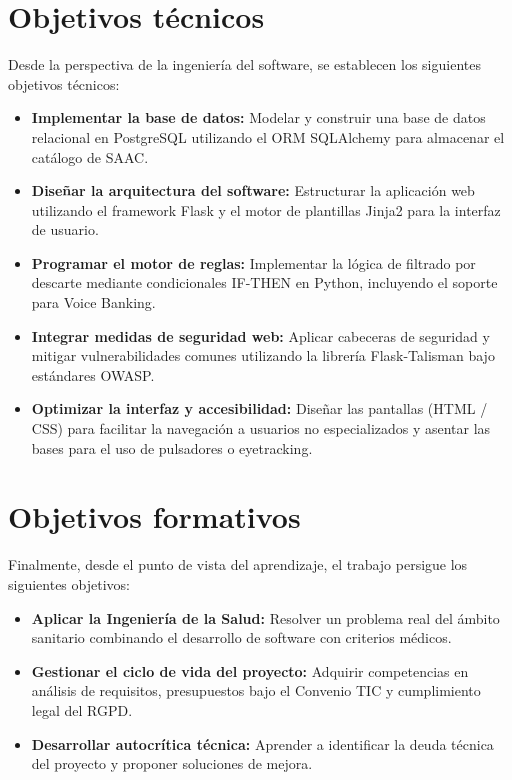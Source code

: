 \section{Objetivos técnicos}
Desde la perspectiva de la ingeniería del software, se establecen los siguientes objetivos técnicos:
\begin{itemize}
    	\item \textbf{Implementar la base de datos:} Modelar y construir una base de datos relacional en PostgreSQL utilizando el ORM SQLAlchemy para almacenar el catálogo de SAAC.
    	\item \textbf{Diseñar la arquitectura del software:} Estructurar la aplicación web utilizando el framework Flask y el motor de plantillas Jinja2 para la interfaz de usuario.
    	\item \textbf{Programar el motor de reglas:} Implementar la lógica de filtrado por descarte mediante condicionales IF-THEN en Python, incluyendo el soporte para Voice Banking.
    	\item \textbf{Integrar medidas de seguridad web:} Aplicar cabeceras de seguridad y mitigar vulnerabilidades comunes utilizando la librería Flask-Talisman bajo estándares OWASP.
    	\item \textbf{Optimizar la interfaz y accesibilidad:} Diseñar las pantallas (HTML / CSS) para facilitar la navegación a usuarios no especializados y asentar las bases para el uso de pulsadores o eyetracking.
\end{itemize}

\section{Objetivos formativos}
Finalmente, desde el punto de vista del aprendizaje, el trabajo persigue los siguientes objetivos:
\begin{itemize}
   	 \item \textbf{Aplicar la Ingeniería de la Salud:} Resolver un problema real del ámbito sanitario combinando el desarrollo de software con criterios médicos.
    	\item \textbf{Gestionar el ciclo de vida del proyecto:} Adquirir competencias en análisis de requisitos, presupuestos bajo el Convenio TIC y cumplimiento legal del RGPD.
    	\item \textbf{Desarrollar autocrítica técnica:} Aprender a identificar la deuda técnica del proyecto y proponer soluciones de mejora.
\end{itemize}